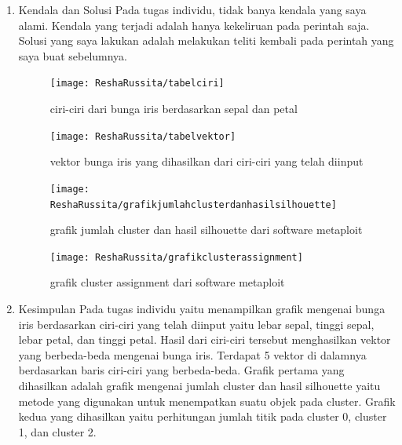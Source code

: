 \begin{enumerate}
\item Kendala dan Solusi
\newline Pada tugas individu, tidak banya kendala yang saya alami. Kendala yang terjadi adalah hanya kekeliruan pada perintah saja. Solusi yang saya lakukan adalah melakukan teliti kembali pada perintah yang saya buat sebelumnya.

\begin{figure}[!ht]
\texttt{[image: ReshaRussita/tabelciri]}
\caption{ciri-ciri dari bunga iris berdasarkan sepal dan petal}
\label{gam:perkuliahan-23-09}
\end{figure}

\begin{figure}[!ht]
\texttt{[image: ReshaRussita/tabelvektor]}
\caption{vektor bunga iris yang dihasilkan dari ciri-ciri yang telah diinput}
\label{gam:perkuliahan-23-09}
\end{figure}

\begin{figure}[!ht]
\texttt{[image: ReshaRussita/grafikjumlahclusterdanhasilsilhouette]}
\caption{grafik jumlah cluster dan hasil silhouette dari software metaploit}
\label{gam:perkuliahan-23-09}
\end{figure}

\begin{figure}[!ht]
\texttt{[image: ReshaRussita/grafikclusterassignment]}
\caption{grafik cluster assignment dari software metaploit}
\label{gam:perkuliahan-23-09}
\end{figure}

\item Kesimpulan
\newline Pada tugas individu yaitu menampilkan grafik mengenai bunga iris berdasarkan ciri-ciri yang telah diinput yaitu lebar sepal, tinggi sepal, lebar petal, dan tinggi petal. Hasil dari ciri-ciri tersebut menghasilkan vektor yang berbeda-beda mengenai bunga iris. Terdapat 5 vektor di dalamnya berdasarkan baris ciri-ciri yang berbeda-beda. 
\newline Grafik pertama yang dihasilkan adalah grafik mengenai jumlah cluster dan hasil silhouette yaitu metode yang digunakan untuk menempatkan suatu objek pada cluster. 
\newline Grafik kedua yang dihasilkan yaitu perhitungan jumlah titik pada cluster 0, cluster 1, dan cluster 2. 

\end{enumerate}

